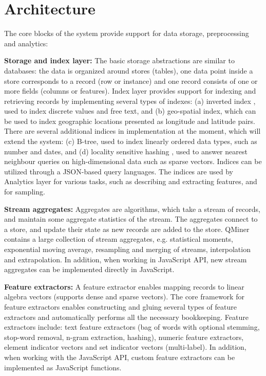 \documentclass{article} %
\begin{document}
\section{Architecture}

The core blocks of the system provide support for data storage, preprocessing and analytics:

\textbf{Storage and index layer:} The basic storage abstractions are similar to databases: the data is organized around stores (tables), one data point inside a store corresponds to a record (row or instance) and one record consists of one or more fields (columns or features). Index layer provides support for indexing and retrieving records by implementing several types of indexes: (a) inverted index \cite[section 6.5]{knuth1998taocp3}, used to index discrete values and free text, and (b) geo-spatial index, which can be used to index geographic locations presented as longitude and latitude pairs. There are several additional indices in implementation at the moment, which will extend the system: (c) B-tree, used to index linearly ordered data types, such as number and dates, and (d) locality sensitive hashing \cite{har2012approximate}, used to answer nearest neighbour queries on high-dimensional data such as sparse vectors. Indices can be utilized through a JSON-based query languages. The indices are used by Analytics layer for various tasks, such as describing and extracting features, and for sampling.

\textbf{Stream aggregates:} Aggregates are algorithms, which take a stream of records, and maintain some aggregate statistics of the stream. The aggregates connect to a store, and update their state as new records are added to the store. QMiner contains a large collection of stream aggregates, e.g. statistical moments, exponential moving average, resampling and merging of streams, interpolation and extrapolation. In addition, when working in JavaScript API, new stream aggregates can be implemented directly in JavaScript.

\textbf{Feature extractors:} A feature extractor enables mapping records to linear algebra vectors (supports dense and sparse vectors). The core framework for feature extractors enables constructing and gluing several types of feature extractors and automatically performs all the necessary bookkeeping. Feature extractors include: text feature extractors (bag of words with optional stemming, stop-word removal, n-gram extraction, hashing), numeric feature extractors, element indicator vectors and set indicator vectors (multi-label). In addition, when working with the JavaScript API, custom feature extractors can be implemented as JavaScript functions.
\end{document}
